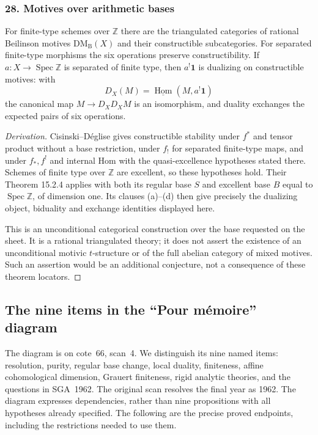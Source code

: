 \subsubsection{28. Motives over arithmetic bases}
\begin{theorem}\label{B:subject28}
For finite-type schemes over $\mathbb Z$ there are the triangulated categories of rational Beilinson motives $\mathrm{DM}_{\mathrm B}(X)$ and their constructible subcategories. For separated finite-type morphisms the six operations preserve constructibility. If $a:X\to\operatorname{Spec}\mathbb Z$ is separated of finite type, then $a^!\mathbf1$ is dualizing on constructible motives: with
\[
 D_X(M)=\underline{\operatorname{Hom}}(M,a^!\mathbf1)
\]
the canonical map $M\to D_XD_XM$ is an isomorphism, and duality exchanges the expected pairs of six operations.
\end{theorem}
\begin{proof}[Derivation]
Cisinski--D\'eglise \cite[Theorem 15.2.1]{BCisinskiDeglise2019} gives constructible stability under $f^*$ and tensor product without a base restriction, under $f_!$ for separated finite-type maps, and under $f_*,f^!$ and internal Hom with the quasi-excellence hypotheses stated there. Schemes of finite type over $\mathbb Z$ are excellent, so these hypotheses hold. Their Theorem 15.2.4 applies with both its regular base $S$ and excellent base $B$ equal to $\operatorname{Spec}\mathbb Z$, of dimension one. Its clauses (a)--(d) then give precisely the dualizing object, biduality and exchange identities displayed here.

This is an unconditional categorical construction over the base requested on the sheet. It is a rational triangulated theory; it does not assert the existence of an unconditional motivic $t$-structure or of the full abelian category of mixed motives. Such an assertion would be an additional conjecture, not a consequence of these theorem locators.
\end{proof}

\subsection{The nine items in the ``Pour m\'emoire'' diagram}
\label{B:pourmemoire}

The diagram is on cote~66, scan~4. We distinguish its nine named items: resolution, purity, regular base change, local duality, finiteness, affine cohomological dimension, Grauert finiteness, rigid analytic theories, and the questions in SGA~1962. The original scan resolves the final year as 1962. The diagram expresses dependencies, rather than nine propositions with all hypotheses already specified. The following are the precise proved endpoints, including the restrictions needed to use them.

